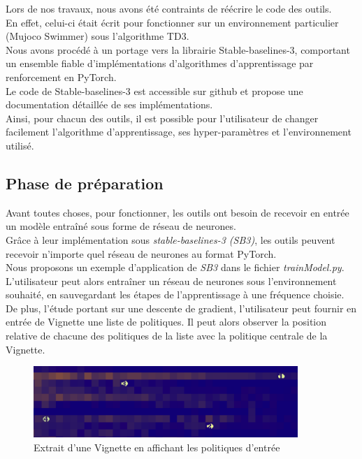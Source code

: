 \documentclass[12pt]{article}
\begin{document}
Lors de nos travaux, nous avons été contraints de réécrire le code des outils. \\

En effet, celui-ci était écrit pour fonctionner sur un environnement particulier (Mujoco Swimmer) sous l’algorithme TD3. \\

Nous avons procédé à un portage vers la librairie Stable-baselines-3, comportant un ensemble fiable d’implémentations d’algorithmes d’apprentissage par renforcement en PyTorch. \\

Le code de Stable-baselines-3 est accessible sur github et propose une documentation détaillée de ses implémentations. \\

Ainsi, pour chacun des outils, il est possible pour l’utilisateur de changer facilement l’algorithme d’apprentissage, ses hyper-paramètres et l’environnement utilisé. \\

\subsection{Phase de préparation}

Avant toutes choses, pour fonctionner, les outils ont besoin de recevoir en entrée un modèle entraîné sous forme de réseau de neurones. \\

Grâce à leur implémentation sous \emph{stable-baselines-3 (SB3)}, les outils peuvent recevoir n'importe quel réseau de neurones au format PyTorch. \\

Nous proposons un exemple d'application de \emph{SB3} dans le fichier \emph{trainModel.py}. L'utilisateur peut alors entraîner un réseau de neurones sous l'environnement souhaité, en sauvegardant les étapes de l'apprentissage à une fréquence choisie. \\

De plus, l'étude portant sur une descente de gradient, l'utilisateur peut fournir en entrée de Vignette une liste de politiques. Il peut alors observer la position relative de chacune des politiques de la liste avec la politique centrale de la Vignette. \\

\begin{figure}[htp]
    \centering
    \includegraphics[width=10cm]{Images/politiques_entrees_vignette}
    \caption{Extrait d'une Vignette en affichant les politiques d'entrée}
    \label{fig:exempleEntree}
\end{figure}
\end{document}
